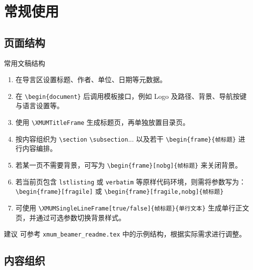 \documentclass[aspectratio=169,11pt]{ctexbeamer}
\begin{document}
\section{常规使用}

\subsection{页面结构}

\begin{frame}{常用文稿结构}
    \begin{enumerate}
        \item 在导言区设置标题、作者、单位、日期等元数据。
        \item 在 \texttt{\textbackslash begin\{document\}} 后调用模板接口，例如 Logo 及路径、背景、导航按键与语言设置等。
        \item 使用 \texttt{\textbackslash XMUMTitleFrame} 生成标题页，再单独放置目录页。
        \item 按内容组织为 \texttt{\textbackslash section} \texttt{\textbackslash subsection}... 以及若干 \texttt{\textbackslash begin\{frame\}\{帧标题\}} 进行内容编排。
        \item 若某一页不需要背景，可写为 \texttt{\textbackslash begin\{frame\}[nobg]\{帧标题\}} 来关闭背景。
        \item 若当前页包含 \texttt{lstlisting} 或 \texttt{verbatim} 等原样代码环境，则需将参数写为：\texttt{\textbackslash begin\{frame\}[fragile]} 或 \texttt{\textbackslash begin\{frame\}[fragile,nobg]\{帧标题\}}
        \item 可使用 \texttt{\textbackslash XMUMSingleLineFrame[true/false]\{帧标题\}\{单行文本\}} 生成单行正文页，并通过可选参数切换背景样式。
    \end{enumerate}

    \begin{block}{建议}
        可参考 \texttt{xmum\_beamer\_readme.tex} 中的示例结构，根据实际需求进行调整。
    \end{block}
\end{frame}

\subsection{内容组织}
\end{document}

